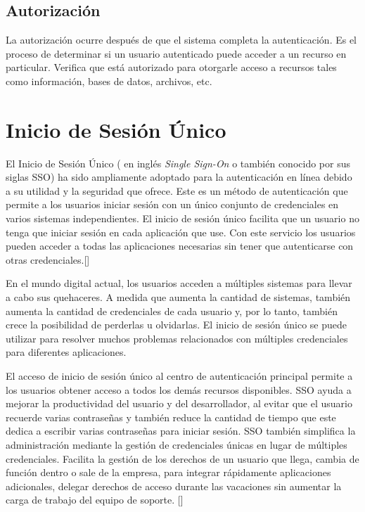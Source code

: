 \subsection*{Autorización}
La autorización ocurre después de que el sistema completa la autenticación. Es el proceso de determinar si un usuario autenticado puede acceder a un recurso en particular. Verifica que está autorizado para otorgarle acceso a recursos tales como información, bases de datos, archivos, etc.



\section*{Inicio de Sesión Único}
El Inicio de Sesión Único ( en inglés \textit{Single Sign-On} o también conocido por sus siglas SSO) ha sido ampliamente adoptado para la autenticación en línea debido a su utilidad y la seguridad que ofrece. Este es un método de autenticación que permite a los usuarios iniciar sesión con un único conjunto de credenciales en varios sistemas independientes. El inicio de sesión único facilita que un usuario no tenga que iniciar sesión en cada aplicación que use. Con este servicio los usuarios pueden acceder a todas las aplicaciones necesarias sin tener que autenticarse con otras credenciales.[\cite{microsoft-doc}]

En el mundo digital actual, los usuarios acceden a múltiples sistemas para llevar a cabo sus quehaceres. A medida que aumenta la cantidad de sistemas, también aumenta la cantidad de credenciales de cada usuario y, por lo tanto, también crece la posibilidad de perderlas u olvidarlas. El inicio de sesión único se puede utilizar para resolver muchos problemas relacionados con múltiples credenciales para diferentes aplicaciones. 

El acceso de inicio de sesión único al centro de autenticación principal permite a los usuarios obtener acceso a todos los demás recursos disponibles. SSO ayuda a mejorar la productividad del usuario y del desarrollador, al evitar que el usuario recuerde varias contraseñas y también reduce la cantidad de tiempo que este dedica a escribir varias contraseñas para iniciar sesión. SSO también simplifica la administración mediante la gestión de credenciales únicas en lugar de múltiples credenciales. Facilita la gestión de los derechos de un usuario que llega, cambia de función dentro o sale de la empresa, para integrar rápidamente aplicaciones adicionales, delegar derechos de acceso durante las vacaciones sin aumentar la carga de trabajo del equipo de soporte. [\cite{radha2012survey}]

